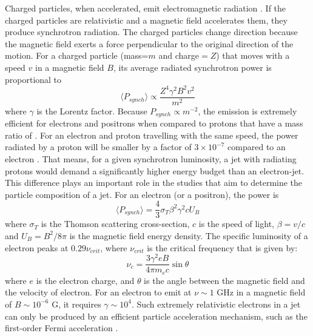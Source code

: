  Charged particles, when accelerated, emit electromagnetic radiation  \cite[for a review, see][]{longair_2011}. If the charged particles are relativistic and a magnetic field accelerates them, they produce synchrotron radiation. The charged particles change direction because the magnetic field exerts a force perpendicular to the original direction of the motion.  For a charged particle (mass=$m$ and charge$=Z$) that moves with a speed $v$ in a magnetic field $B$, its average radiated synchrotron power is proportional to 
\begin{equation}
    \langle  P_{synch} \rangle\propto \frac{Z^4\gamma^2B^2v^2}{m^2}
\end{equation}
 where $\gamma$ is the Lorentz factor.  Because $P_{synch}\propto m^{-2}$, the emission is extremely efficient for electrons and positrons when compared to protons that have a mass ratio of . For an electron and proton travelling with the same speed, the power radiated by a proton will be smaller by a factor of $3\times10^{-7}$ compared to an electron
 . That means, for a given synchrotron luminosity, a jet with radiating protons would demand a significantly higher energy budget than an electron-jet. This difference plays an important role in the studies that aim to determine the particle composition of a jet. For an electron (or a positron), the power is
\begin{equation}\label{eq:synch_pow}
    \langle  P_{synch} \rangle=\frac{4}{3}\sigma_T\beta^2\gamma^2cU_B
\end{equation}
where $\sigma_T$ is the Thomson scattering cross-section, $c$ is the speed of light, $\beta=v/c$ and $U_B=B^2/8\pi$ is the magnetic field energy density. The specific luminosity of a electron peaks at $0.29\nu_{crit}$, where $\nu_{crit}$ is the critical frequency that is given by:
\begin{equation}
    \nu_c = \frac{3\gamma^2eB}{4\pi m_e c}\sin{\theta}
\end{equation}
where $e$ is the electron charge, and $\theta$ is the angle between the magnetic field and the velocity of electron. For an electron to emit at $\nu\sim1$ GHz in a magnetic field of $B\sim10^{-6}$ G, it requires $\gamma\sim10^{4}$. Such extremely relativistic electrons in a jet can only be produced by an efficient particle acceleration mechanism, such as the first-order Fermi acceleration \citep{1949PhRv...75.1169F}.

